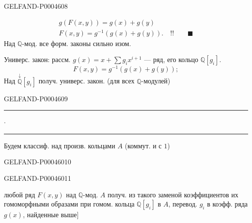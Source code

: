 \begin{GelfandAdjacentEvidence}{GELFAND-P000460}{8}

\[
\begin{gathered}
g(F(x,y))=g(x)+g(y)\\
F(x,y)=g^{-1}(g(x)+g(y)).\quad !!\qquad\blacksquare
\end{gathered}
\]
\quad Над $\mathbb Q$-мод. все форм. законы сильно изом.

Универс. закон: рассм. $g(x)=x+\sum g_i x^{i+1}$ — ряд, его кольцо $\mathbb Q[g_i]$.
\[
F(x,y)=g^{-1}(g(x)+g(y));
\]
Над $\overset{\downarrow}{\mathbb Q}[g_i]$ получ. универс. закон.
(для всех $\mathbb Q$-модулей)
\end{GelfandAdjacentEvidence}
\begin{GelfandAdjacentEvidence}{GELFAND-P000460}{9}


\begin{center}
\rule[.5ex]{17mm}{.35pt}\enspace$\cdot$\enspace\rule[.5ex]{22mm}{.35pt}
\end{center}

Будем классиф. над произв. кольцами $A$ (коммут. и с $1$)
\end{GelfandAdjacentEvidence}
\begin{GelfandAdjacentEvidence}{GELFAND-P000460}{10}


\end{GelfandAdjacentEvidence}
\begin{GelfandAdjacentEvidence}{GELFAND-P000460}{11}

любой ряд $F(x,y)$ над $\mathbb Q$-мод. $A$ получ. из такого заменой коэффициентов их гомоморфными образами при гомом. кольца
$\mathbb Q[g_i]$ в $A$, перевод. $g_i$ в коэфф. ряда $g(x)$,
найденные выше\(\bigr]\)
\end{GelfandAdjacentEvidence}



